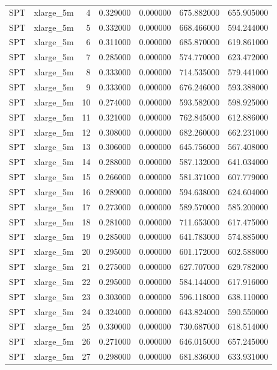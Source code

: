 \begin{tabular}{llrrrrr}
SPT & xlarge_5m & 4 & 0.329000 & 0.000000 & 675.882000 & 655.905000 \\
SPT & xlarge_5m & 5 & 0.332000 & 0.000000 & 668.466000 & 594.244000 \\
SPT & xlarge_5m & 6 & 0.311000 & 0.000000 & 685.870000 & 619.861000 \\
SPT & xlarge_5m & 7 & 0.285000 & 0.000000 & 574.770000 & 623.472000 \\
SPT & xlarge_5m & 8 & 0.333000 & 0.000000 & 714.535000 & 579.441000 \\
SPT & xlarge_5m & 9 & 0.333000 & 0.000000 & 676.246000 & 593.388000 \\
SPT & xlarge_5m & 10 & 0.274000 & 0.000000 & 593.582000 & 598.925000 \\
SPT & xlarge_5m & 11 & 0.321000 & 0.000000 & 762.845000 & 612.886000 \\
SPT & xlarge_5m & 12 & 0.308000 & 0.000000 & 682.260000 & 662.231000 \\
SPT & xlarge_5m & 13 & 0.306000 & 0.000000 & 645.756000 & 567.408000 \\
SPT & xlarge_5m & 14 & 0.288000 & 0.000000 & 587.132000 & 641.034000 \\
SPT & xlarge_5m & 15 & 0.266000 & 0.000000 & 581.371000 & 607.779000 \\
SPT & xlarge_5m & 16 & 0.289000 & 0.000000 & 594.638000 & 624.604000 \\
SPT & xlarge_5m & 17 & 0.273000 & 0.000000 & 589.570000 & 585.200000 \\
SPT & xlarge_5m & 18 & 0.281000 & 0.000000 & 711.653000 & 617.475000 \\
SPT & xlarge_5m & 19 & 0.285000 & 0.000000 & 641.783000 & 574.885000 \\
SPT & xlarge_5m & 20 & 0.295000 & 0.000000 & 601.172000 & 602.588000 \\
SPT & xlarge_5m & 21 & 0.275000 & 0.000000 & 627.707000 & 629.782000 \\
SPT & xlarge_5m & 22 & 0.295000 & 0.000000 & 584.144000 & 617.916000 \\
SPT & xlarge_5m & 23 & 0.303000 & 0.000000 & 596.118000 & 638.110000 \\
SPT & xlarge_5m & 24 & 0.324000 & 0.000000 & 643.824000 & 590.550000 \\
SPT & xlarge_5m & 25 & 0.330000 & 0.000000 & 730.687000 & 618.514000 \\
SPT & xlarge_5m & 26 & 0.271000 & 0.000000 & 646.015000 & 657.245000 \\
SPT & xlarge_5m & 27 & 0.298000 & 0.000000 & 681.836000 & 633.931000 \\

\end{tabular}
